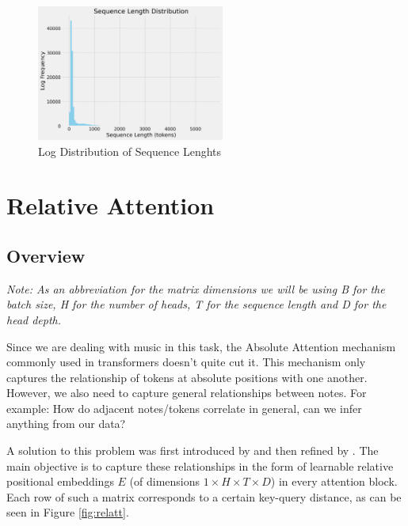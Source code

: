 \documentclass[a4paper,12pt]{extarticle}
\begin{document}
\begin{figure}[H]
    \centering
    \includegraphics[width=0.55\textwidth]{visualization_4096_REMI_train_manual_tokens_True_random_padding_True_seq_length_distribution.png}
    \caption{Log Distribution of Sequence Lenghts}
    \label{fig:log_seq_len}
\end{figure}


\section{Relative Attention}
\subsection{Overview}

\textit{Note: As an abbreviation for the matrix dimensions we will be using B for the batch size, H for the number of heads, T for the sequence length and D for the head depth.} \newline

Since we are dealing with music in this task, the Absolute Attention mechanism commonly used in transformers \parencite{DBLP:journals/corr/VaswaniSPUJGKP17} doesn't quite cut it. This mechanism only captures the relationship of tokens at absolute positions with one another. However, we also need to capture general relationships between notes. For example: How do adjacent notes/tokens correlate in general, can we infer anything from our data? \newline

A solution to this problem was first introduced by \textcite{shaw2018selfattentionrelativepositionrepresentations} and then refined by \textcite{DBLP:journals/corr/abs-1809-04281}. The main objective is to capture these relationships in the form of learnable relative positional embeddings $E$ (of dimensions $1 \times H \times T \times D$) in every attention block. Each row of such a matrix corresponds to a certain key-query distance, as can be seen in Figure \ref{fig:relatt}. 
\newline
\end{document}

